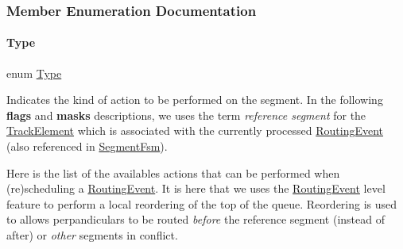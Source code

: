 \subsubsection{Member Enumeration Documentation}
\mbox{\label{classKite_1_1SegmentAction_a1d1cfd8ffb84e947f82999c682b666a7}} 
\paragraph{\texorpdfstring{Type}{Type}}
{\footnotesize\ttfamily enum \hyperlink{classKite_1_1SegmentAction_a1d1cfd8ffb84e947f82999c682b666a7}{Type}}

Indicates the kind of action to be performed on the segment. In the following {\bfseries flags} and {\bfseries masks} descriptions, we uses the term {\itshape reference segment} for the \hyperlink{classKite_1_1TrackElement}{Track\+Element} which is associated with the currently processed \hyperlink{classKite_1_1RoutingEvent}{Routing\+Event} (also referenced in \hyperlink{classKite_1_1SegmentFsm}{Segment\+Fsm}).

Here is the list of the availables actions that can be performed when (re)scheduling a \hyperlink{classKite_1_1RoutingEvent}{Routing\+Event}. It is here that we uses the \hyperlink{classKite_1_1RoutingEvent}{Routing\+Event} level feature to perform a local reordering of the top of the queue. Reordering is used to allows perpandiculars to be routed {\itshape before} the reference segment (instead of after) or {\itshape other} segments in conflict.


